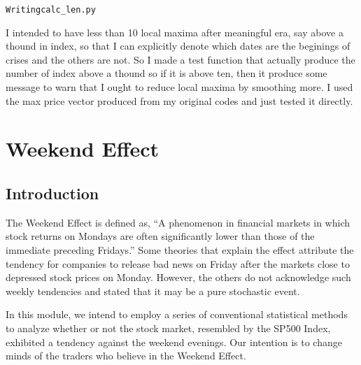 \documentclass[letterpaper,10pt,english]{/Users/edwsurewin/anaconda/lib/python2.7/site-packages/sphinx/texinputs/sphinxhowto}
\newenvironment{InvisibleVerbatim}
        {\begin{mdframed}[leftmargin=0.1\linewidth,innerleftmargin=3pt,innerrightmargin=3pt, userdefinedwidth=1\linewidth, linewidth=0pt, linecolor=white, usetwoside=false]}
        {\end{mdframed}}
\begin{document}
    

        
        

            
                \begin{InvisibleVerbatim}
                \vspace{-0.5\baselineskip}
\begin{alltt}Writing calc\_len.py
\end{alltt}

            \end{InvisibleVerbatim}
            
        
    
I intended to have less than 10 local maxima after meaningful era, say
above a thound in index, so that I can explicitly denote which dates are
the beginings of crises and the others are not. So I made a test
function that actually produce the number of index above a thound so if
it is above ten, then it produce some message to warn that I ought to
reduce local maxima by smoothing more. I used the max price vector
produced from my original codes and just tested it directly.\section{Weekend Effect}\label{weekend-effect}\subsection{Introduction}\label{introduction}

The Weekend Effect is defined as, ``A phenomenon in financial markets in
which stock returns on Mondays are often significantly lower than those
of the immediate preceding Fridays.'' Some theories that explain the
effect attribute the tendency for companies to release bad news on
Friday after the markets close to depressed stock prices on Monday.
However, the others do not acknowledge such weekly tendencies and stated
that it may be a pure stochastic event.

In this module, we intend to employ a series of conventional statistical
methods to analyze whether or not the stock market, resembled by the
SP500 Index, exhibited a tendency against the weekend evenings. Our
intention is to change minds of the traders who believe in the Weekend
Effect.
\end{document}
